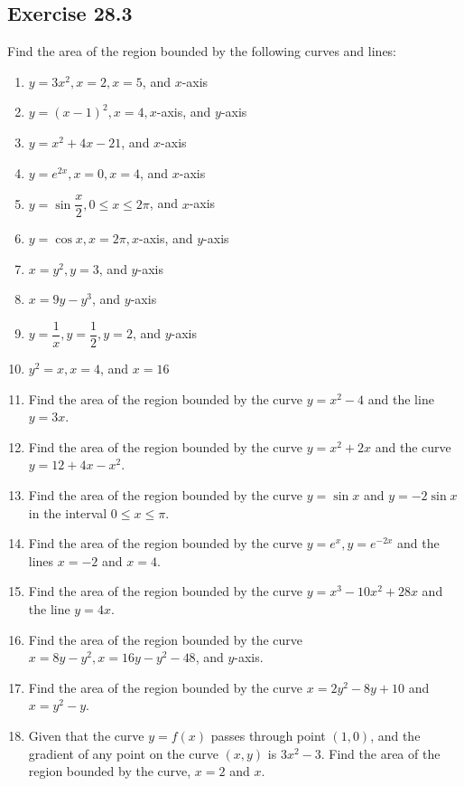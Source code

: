 \documentclass{report}
\begin{document}
\subsection{Exercise 28.3}

\hspace{10pt} Find the area of the region bounded by the following curves and lines:
\begin{enumerate}
    \item $y=3 x^2, x=2, x=5$, and $x$-axis
    \item $y=(x-1)^2, x=4, x$-axis, and $y$-axis
    \item $y=x^2+4 x-21$, and $x$-axis
    \item $y=e^{2 x}, x=0, x=4$, and $x$-axis
    \item $y=\sin \dfrac{x}{2}, 0 \leq x \leq 2 \pi$, and $x$-axis
    \item $y=\cos x, x=2 \pi, x$-axis, and $y$-axis
    \item $x=y^2, y=3$, and $y$-axis
    \item $x=9 y-y^3$, and $y$-axis
    \item $y=\dfrac{1}{x}, y=\dfrac{1}{2}, y=2$, and $y$-axis
    \item $y^2=x, x=4$, and $x=16$
    \item Find the area of the region bounded by the curve $y=x^2-4$ and the line $y=3
              x$.
    \item Find the area of the region bounded by the curve $y=x^2+2 x$ and the curve
          $y=12+4 x-x^2$.
    \item Find the area of the region bounded by the curve $y=\sin x$ and $y=-2 \sin x$
          in the interval $0 \leq x \leq \pi$.
    \item Find the area of the region bounded by the curve $y=e^x, y=e^{-2 x}$ and the
          lines $x=-2$ and $x=4$.
    \item Find the area of the region bounded by the curve $y=x^3-10 x^2+28 x$ and the
          line $y=4 x$.
    \item Find the area of the region bounded by the curve $x=8 y-y^2, x=16 y-y^2-48$,
          and $y$-axis.
    \item Find the area of the region bounded by the curve $x=2 y^2-8 y+10$ and
          $x=y^2-y$.
    \item Given that the curve $y=f(x)$ passes through point $(1,0)$, and the gradient of
          any point on the curve $(x, y)$ is $3 x^2-3$. Find the area of the region
          bounded by the curve, $x=2$ and $x$.
\end{enumerate}
\end{document}
